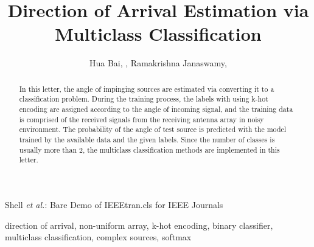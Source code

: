 \documentclass[journal]{IEEEtran}
\begin{document}
%
\title{Direction of Arrival Estimation via Multiclass Classification}
%
%
%

\author{Hua Bai, , Ramakrishna Janaswamy, }%

\markboth{}%
{Shell \MakeLowercase{\textit{et al.}}: Bare Demo of IEEEtran.cls for IEEE Journals}
% 


\maketitle

\begin{abstract}
In this letter, the angle of impinging sources are estimated via converting it to a classification problem.
During the training process, the labels with using k-hot encoding are assigned according to the angle of incoming signal, and the training data is comprised of the received signals from the receiving antenna array in noisy environment.
The probability of the angle of test source is predicted with the model trained by the available data and the given labels. 
Since the number of classes is usually more than 2, the multiclass classification methods are implemented in this letter.        
\end{abstract}

\begin{IEEEkeywords}
direction of arrival, non-uniform array, k-hot encoding, binary classifier, multiclass classification, complex sources, softmax
\end{IEEEkeywords}
\end{document}
